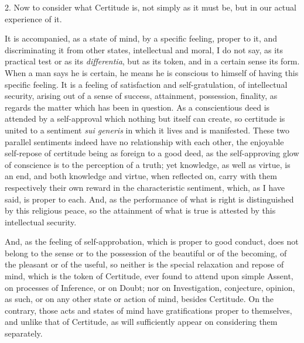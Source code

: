 2. Now to consider what Certitude is, not simply as it must be, but
in our actual experience of it.

It is accompanied, as a state of mind, by a specific feeling,
proper to it, and discriminating it from other states,
intellectual and moral, I do not say, as its practical test or as its \emph{differentia},
but as its token, and in a certain sense its form. When a man says he
is certain, he means he is conscious to himself of having this
specific feeling. It is a feeling of satisfaction and self-gratulation,
of intellectual security, arising out of a sense of success,
attainment, possession, finality, as regards the matter which has been
in question. As a conscientious deed is attended by a self-approval
which nothing but itself can create, so certitude is united to a
sentiment \emph{sui generis} in which it lives and is manifested.
These two parallel sentiments indeed have no relationship with each
other, the enjoyable self-repose of certitude being as foreign to a
good deed, as the self-approving glow of conscience is to the
perception of a truth; yet knowledge, as well as virtue, is an end,
and both knowledge and virtue, when reflected on, carry with them
respectively their own reward in the characteristic sentiment, which,
as I have said, is proper to each. And, as the performance of what is
right is distinguished by this religious peace, so the attainment of
what is true is attested by this intellectual security.

And, as the feeling of self-approbation, which is proper to good
conduct, does not belong to the sense or to the possession of the
beautiful or of the becoming, of the pleasant or of the useful, so
neither is the special relaxation and repose of mind, which is the
token of Certitude, ever found to attend upon simple Assent, on
processes of Inference, or on Doubt; nor on Investigation, conjecture,
opinion, as such, or on any other state or action of mind,
besides Certitude. On the contrary, those acts and states of mind have
gratifications proper to themselves, and unlike that of Certitude, as
will sufficiently appear on considering them separately.

